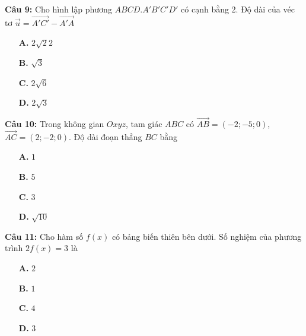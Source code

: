 \documentclass[12pt, a4paper]{article}
\begin{document}
\textbf{Câu 9: } Cho hình lập phương $ ABCD. A'B'C'D' $ có cạnh bằng 2. Độ dài của véc tơ $ \overrightarrow{u} = \overrightarrow{A'C'} - \overrightarrow{A'A} $
	\begin{multicols}{4}
		\begin{enumerate}
			\item[\textbf{A.}] $ 2 \sqrt{2} 2 $
			\item[\textbf{B.}] $ \sqrt{3} $
			\item[\textbf{C.}] $ 2\sqrt{6} $
			\item[\textbf{D.}] $ 2\sqrt{3} $
		\end{enumerate}
	\end{multicols}
	
\textbf{Câu 10: } Trong không gian $ Oxyz $, tam giác $ ABC $ có $ \overrightarrow{AB} = (-2;-5;0) $, $ \overrightarrow{AC} = (2;-2;0) $. Độ dài đoạn thẳng $ BC $ bằng
	\begin{multicols}{4}
		\begin{enumerate}
			\item[\textbf{A.}] $ 1 $
			\item[\textbf{B.}] $ 5 $
			\item[\textbf{C.}] $ 3 $
			\item[\textbf{D.}] $ \sqrt{10} $
		\end{enumerate}
	\end{multicols}
	
\textbf{Câu 11: } Cho hàm số $ f(x) $ có bảng biến thiên bên dưới. Số nghiệm của phương trình $ 2f(x) = 3 $ là 
	\begin{center}
	\end{center}
	\begin{multicols}{4}
		\begin{enumerate}
			\item[\textbf{A.}] $ 2 $
			\item[\textbf{B.}] $ 1 $
			\item[\textbf{C.}] $ 4 $
			\item[\textbf{D.}] $ 3 $
		\end{enumerate}
	\end{multicols}
	
\end{document}

